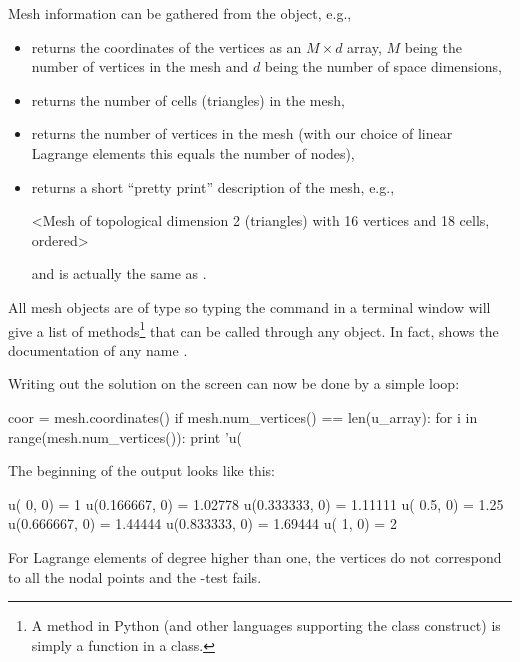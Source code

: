 Mesh information can be gathered from the  object, e.g.,
\begin{itemize}
  \item {} returns the coordinates of the
  vertices as an $M\times d$  array,
  $M$ being the number of vertices in the mesh and $d$ being
  the number of space dimensions,

  \item {} returns the number of cells (triangles)
  in the mesh,

  \item {} returns the number of vertices in
  the mesh (with our choice of linear Lagrange elements this equals the
  number of nodes),

  \item {} returns a short ``pretty print'' description of
  the mesh, e.g.,
\begin{progoutput}
<Mesh of topological dimension 2 (triangles) with
16 vertices and 18 cells, ordered>
\end{progoutput}
  \noindent
  and  is actually the same as .
\end{itemize}
All mesh objects are of type  so typing the command  in a terminal window will give a list
of methods\footnote{A method in Python (and other
  languages supporting the class construct) is simply a function in a
  class.} that can be called through any  object. In fact,
 shows the documentation of any \dolfin{} name .

Writing out the solution on the screen can now be done by a simple loop:
\begin{python}
coor = mesh.coordinates()
if mesh.num_vertices() == len(u_array):
    for i in range(mesh.num_vertices()):
        print 'u(%
\end{python}
The beginning of the output looks like this:
\begin{progoutput}
u(       0,       0) = 1
u(0.166667,       0) = 1.02778
u(0.333333,       0) = 1.11111
u(     0.5,       0) = 1.25
u(0.666667,       0) = 1.44444
u(0.833333,       0) = 1.69444
u(       1,       0) = 2
\end{progoutput}
\noindent
For Lagrange elements of degree higher than one, the vertices do not
correspond to all the nodal points and the -test fails.

